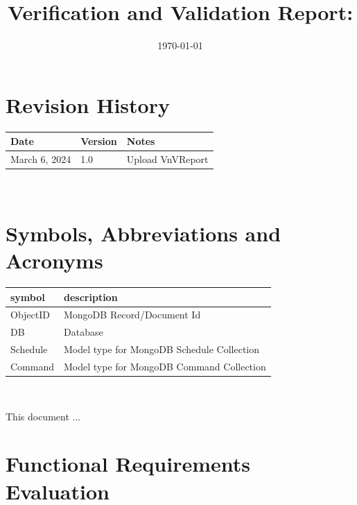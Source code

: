 \documentclass[12pt, titlepage]{article}
\begin{document}
\title{Verification and Validation Report: \progname} 
\author{\authname}
\date{\today}
	
\maketitle


\section{Revision History}

\begin{tabularx}{\textwidth}{p{3cm}p{2cm}X}
\toprule {\bf Date} & {\bf Version} & {\bf Notes}\\
\midrule
March 6, 2024 & 1.0 & Upload VnVReport\\
\bottomrule
\end{tabularx}

~\newpage

\section{Symbols, Abbreviations and Acronyms}

\renewcommand{\arraystretch}{1.2}
\begin{tabular}{l l} 
  \toprule		
  \textbf{symbol} & \textbf{description}\\
  \midrule 
  ObjectID & MongoDB Record/Document Id\\
  DB & Database\\
  Schedule & Model type for MongoDB Schedule Collection \\
  Command & Model type for MongoDB Command Collection \\
  \bottomrule
\end{tabular}\\


\newpage

\tableofcontents

\listoftables %

\listoffigures %

\newpage


This document ...

\section{Functional Requirements Evaluation}
\end{document}
